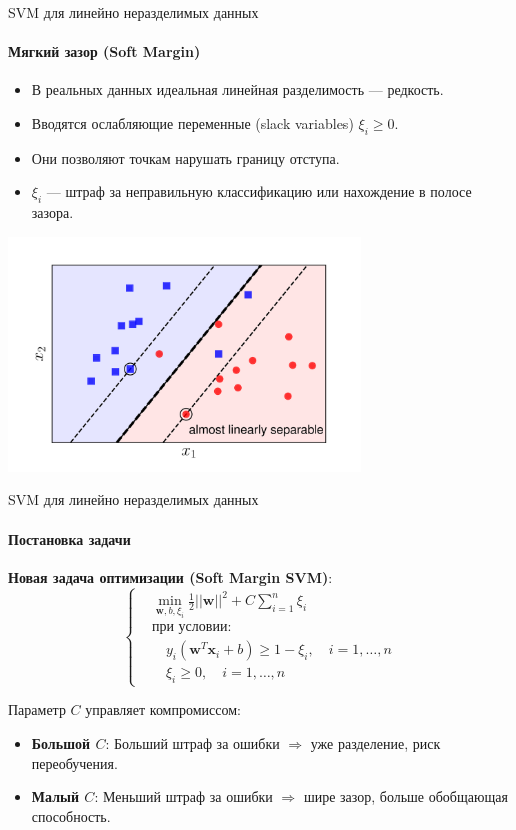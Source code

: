 \documentclass[notheorems, handout]{beamer}
\begin{document}
\begin{frame}{SVM для линейно неразделимых данных}
	\framesubtitle{Мягкий зазор (Soft Margin)}

	\begin{itemize}
		\item В реальных данных идеальная линейная разделимость — редкость.
		\item Вводятся \alert{ослабляющие переменные (slack variables)} $\xi_i \geq 0$.
		\item Они позволяют точкам нарушать границу отступа.
		\item $\xi_i$ — штраф за неправильную классификацию или нахождение в полосе зазора.
	\end{itemize}
	\begin{center}
		\includegraphics[width=0.7\textwidth]{img/soft_margin.png}
	\end{center}
\end{frame}

\begin{frame}{SVM для линейно неразделимых данных}
	\framesubtitle{Постановка задачи}
	\textbf{Новая задача оптимизации (Soft Margin SVM)}:
	\[
	\begin{cases}
		& \min_{\mathbf{w}, b, \xi_i} \frac{1}{2} ||\mathbf{w}||^2 + C \sum_{i=1}^n \xi_i \\
		& \text{при условии:} \\
		& \quad y_i (\mathbf{w}^T \mathbf{x}_i + b) \geq 1 - \xi_i, \quad i = 1, \dots, n \\
		& \quad \xi_i \geq 0, \quad i = 1, \dots, n
	\end{cases}
	\]

	\alert{Параметр $C$} управляет компромиссом:
	\begin{itemize}
		\item \textbf{Большой $C$}: Больший штраф за ошибки $\Rightarrow$ уже разделение, риск переобучения.
		\item \textbf{Малый $C$}: Меньший штраф за ошибки $\Rightarrow$ шире зазор, больше обобщающая способность.
	\end{itemize}
\end{frame}
\end{document}

